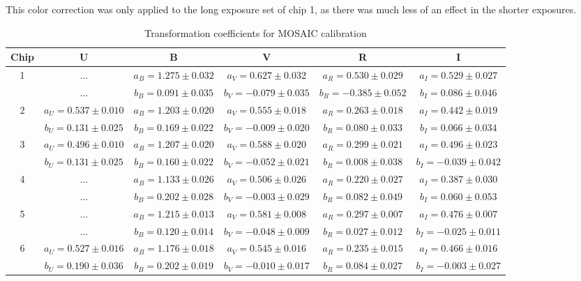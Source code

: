 \documentclass[iop]{emulateapj}
\begin{document}
This color correction was only applied to the long exposure set of chip 1, as there was much less of an effect in the shorter exposures.

\begin{table} \centering 
\caption{Transformation coefficients for MOSAIC calibration \label{tab:MOScoeffs}}
\begin{tabular}{c|c|c|c|c|c} \hline \hline
Chip 				& 		U 					& 			B 				& 		V 					& 		R 					& 		I 			 \\ \hline
\multirow{2}{*}{1} 	& ...						& $a_B = 1.275 \pm 0.032$ & $a_V = 0.627 \pm 0.032$  & $a_R = 0.530 \pm 0.029$ 	& $a_I = 0.529 \pm 0.027$ \\
					& ...						& $b_B = 0.091 \pm 0.035$ & $b_V = -0.079 \pm 0.035$ & $b_R = -0.385 \pm 0.052$	& $b_I = 0.086 \pm 0.046$ \\ \hline

\multirow{2}{*}{2} 	& $a_U = 0.537 \pm 0.010$ & $a_B = 1.203 \pm 0.020$ & $a_V = 0.555 \pm 0.018$ 	& $a_R = 0.263 \pm 0.018$ 	& $a_I = 0.442 \pm 0.019$ \\
					& $b_U = 0.131 \pm 0.025$ & $b_B = 0.169 \pm 0.022$	& $b_V = -0.009 \pm 0.020$	& $b_R = 0.080 \pm 0.033$	& $b_I = 0.066 \pm 0.034$ \\ \hline
					
\multirow{2}{*}{3} 	& $a_U = 0.496 \pm 0.010$ & $a_B = 1.207 \pm 0.020$ & $a_V = 0.588 \pm 0.020$ 	& $a_R = 0.299 \pm 0.021$ 	& $a_I = 0.496 \pm 0.023$ \\
					& $b_U = 0.131 \pm 0.025$ & $b_B = 0.160 \pm 0.022$	& $b_V = -0.052 \pm 0.021$	& $b_R = 0.008 \pm 0.038$	& $b_I = -0.039 \pm 0.042$ \\ \hline
					
\multirow{2}{*}{4} 	& ...					  & $a_B = 1.133 \pm 0.026$ & $a_V = 0.506 \pm 0.026$ 	& $a_R = 0.220 \pm 0.027$ 	& $a_I = 0.387 \pm 0.030$ \\
					& ...					  & $b_B = 0.202 \pm 0.028$	& $b_V = -0.003 \pm 0.029$	& $b_R = 0.082 \pm 0.049$	& $b_I = 0.060 \pm 0.053$ \\ \hline
					
\multirow{2}{*}{5} 	& ...					  & $a_B = 1.215 \pm 0.013$ & $a_V = 0.581 \pm 0.008$ 	& $a_R = 0.297 \pm 0.007$ 	& $a_I = 0.476 \pm 0.007$ \\
					& ...					  & $b_B = 0.120 \pm 0.014$	& $b_V = -0.048 \pm 0.009$	& $b_R = 0.027 \pm 0.012$	& $b_I = -0.025 \pm 0.011$ \\ \hline
					
\multirow{2}{*}{6} 	& $a_U = 0.527 \pm 0.016$ & $a_B = 1.176 \pm 0.018$ & $a_V = 0.545 \pm 0.016$ 	& $a_R = 0.235 \pm 0.015$ 	& $a_I = 0.466 \pm 0.016$ \\
					& $b_U = 0.190 \pm 0.036$ & $b_B = 0.202 \pm 0.019$	& $b_V = -0.010 \pm 0.017$	& $b_R = 0.084 \pm 0.027$	& $b_I = -0.003 \pm 0.027$ \\ \hline
					

\end{tabular}
\end{table}
\end{document}
